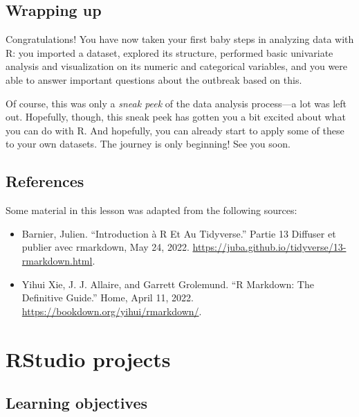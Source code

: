 \documentclass[
  letterpaper,
  DIV=11,
  numbers=noendperiod]{scrreprt}
\begin{document}
\hypertarget{wrapping-up-2}{%
\section{Wrapping up}\label{wrapping-up-2}}

Congratulations! You have now taken your first baby steps in analyzing
data with R: you imported a dataset, explored its structure, performed
basic univariate analysis and visualization on its numeric and
categorical variables, and you were able to answer important questions
about the outbreak based on this.

Of course, this was only a \emph{sneak peek} of the data analysis
process---a lot was left out. Hopefully, though, this sneak peek has
gotten you a bit excited about what you can do with R. And hopefully,
you can already start to apply some of these to your own datasets. The
journey is only beginning! See you soon.

\hypertarget{references-4}{%
\section*{References}\label{references-4}}


Some material in this lesson was adapted from the following sources:

\begin{itemize}
\item
  Barnier, Julien. ``Introduction à R Et Au Tidyverse.'' Partie 13
  Diffuser et publier avec rmarkdown, May 24, 2022.
  \url{https://juba.github.io/tidyverse/13-rmarkdown.html}.
\item
  Yihui Xie, J. J. Allaire, and Garrett Grolemund. ``R Markdown: The
  Definitive Guide.'' Home, April 11, 2022.
  \url{https://bookdown.org/yihui/rmarkdown/}.
\end{itemize}


\hypertarget{rstudio-projects}{%
\chapter{RStudio projects}\label{rstudio-projects}}

\hypertarget{learning-objectives-3}{%
\section{Learning objectives}\label{learning-objectives-3}}
\end{document}
